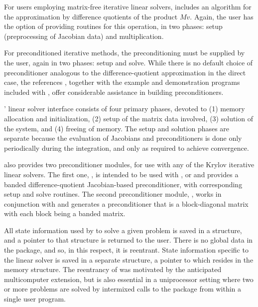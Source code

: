 For users employing matrix-free iterative linear solvers,
 {\cvodes}
includes an algorithm for the approximation by difference quotients of
the product $Mv$. Again, the user has the option of providing routines
for this operation, in two phases: setup (preprocessing of Jacobian
data) and multiplication. 

For preconditioned iterative methods,  
the preconditioning must be supplied by the user, again in two phases: 
setup and solve.  While there is no
default choice of preconditioner analogous to the difference-quotient
approximation in the direct case, the references
\cite{BrHi:89,Byr:92}, together with the example and demonstration
programs included with {\cvodes}, offer considerable assistance in
building preconditioners. 

{\cvodes}' linear solver interface consists of four primary phases,
devoted to (1) memory allocation and initialization, (2) setup of the
matrix data involved, (3) solution of the system, and (4) freeing of memory.  
The setup and solution phases are separate because the evaluation of
Jacobians and preconditioners is done only periodically during the
integration, and only as required to achieve convergence. 

{\cvodes} also provides two preconditioner modules, for use with any of
the Krylov iterative linear solvers. The first one, {\cvbandpre},
is intended to be used with {\nvecs}, {\nvecopenmp} or {\nvecpthreads}
and provides a banded difference-quotient Jacobian-based
preconditioner, with corresponding setup and solve routines.
The second preconditioner module, {\cvbbdpre}, works in conjunction
with {\nvecp} and generates a preconditioner that is a block-diagonal
matrix with each block being a banded matrix.

All state information used by {\cvodes} to solve a given problem is saved
in a structure, and a pointer to that structure is returned to the
user.  There is no global data in the {\cvodes} package, and so, in this
respect, it is reentrant. State information specific to the linear
solver is saved in a separate structure, a pointer to which resides in
the {\cvodes} memory structure. The reentrancy of {\cvodes} was motivated
by the anticipated multicomputer extension, but is also essential
in a uniprocessor setting where two or more problems are solved by
intermixed calls to the package from within a single user program.
